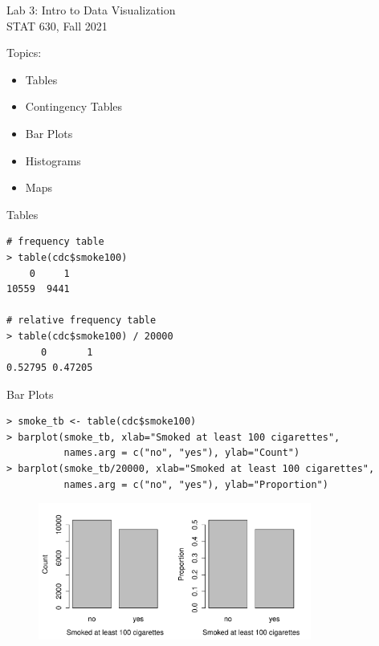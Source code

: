 \documentclass[10pt]{beamer}
\begin{document}
\begin{frame}
\large
Lab 3: Intro to Data Visualization\\
STAT 630, Fall 2021
\vspace{15pt}

\normalsize
Topics:
\begin{itemize}
\item Tables
\item Contingency Tables
\item Bar Plots
\item Histograms
\item Maps
\end{itemize}
\end{frame}

\begin{frame}[fragile]{Tables}
\begin{verbatim}
# frequency table
> table(cdc$smoke100)
    0     1 
10559  9441 

# relative frequency table
> table(cdc$smoke100) / 20000
      0       1 
0.52795 0.47205 
\end{verbatim}
\end{frame}

\begin{frame}[fragile]{Bar Plots}
\small
\begin{verbatim}
> smoke_tb <- table(cdc$smoke100)
> barplot(smoke_tb, xlab="Smoked at least 100 cigarettes", 
          names.arg = c("no", "yes"), ylab="Count") 
> barplot(smoke_tb/20000, xlab="Smoked at least 100 cigarettes", 
          names.arg = c("no", "yes"), ylab="Proportion")
\end{verbatim}
\normalsize

\begin{figure}[htbp]
\centering
\includegraphics[width=0.8\textwidth]{figure/barplot_smoke.pdf}
\end{figure}
\end{frame}
\end{document}
